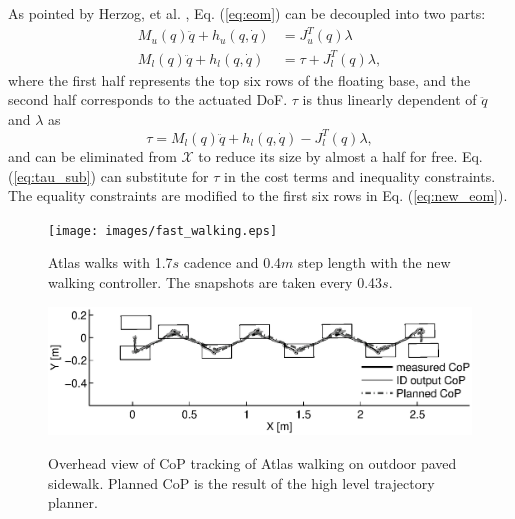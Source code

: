 \documentclass{ws-ijhr}
\newcommand{\eref}[1] {Eq. (\ref{#1})}
\newcommand{\QPx}{\mathcal{X}}
\begin{document}
As pointed by Herzog, et al. \cite{alex_hir}, \eref{eq:eom} can be decoupled 
into two parts:
\begin{equation}
	\begin{split}
		M_u(q) \ddot{q} + h_u(q,\dot{q}) &= J^T_u(q) \lambda \\
		M_l(q) \ddot{q} + h_l(q,\dot{q}) &= \tau + J^T_l(q) \lambda,
	\end{split}
\label{eq:new_eom}
\end{equation} 
where the first half represents the top six rows of the floating base, 
and the second half corresponds to the actuated DoF. 
$\tau$ is thus linearly dependent of $\ddot{q}$ and $\lambda$ as
\begin{equation}
	\tau = M_l(q) \ddot{q} + h_l(q,\dot{q}) - J^T_l(q) \lambda,
\label{eq:tau_sub}
\end{equation} 
and can be eliminated from $\QPx$ to reduce its size by almost a half for free. 
\eref{eq:tau_sub} can substitute for $\tau$ in the cost terms and inequality 
constraints. 
The equality constraints are modified to the first six rows in \eref{eq:new_eom}.

\begin{figure} 
  \begin{center}
    {\texttt{[image: images/fast\_walking.eps]}}
    \caption{Atlas walks with 1.7$s$ cadence and 0.4$m$ step length with the
		new walking controller. The snapshots are taken every 0.43$s$.} 
		\label{fig:fast_walking}
  \end{center}
\end{figure}   

\begin{figure} 
  \begin{center}
    {\includegraphics[width=1\textwidth]{images/new_cop.eps}}
    \caption{Overhead view of CoP tracking of Atlas walking on outdoor paved 
		sidewalk. 
		Planned CoP is the result of the high level trajectory planner. } 
		\label{fig:long_walk_cop}
  \end{center}
\end{figure}   
 
\end{document}
